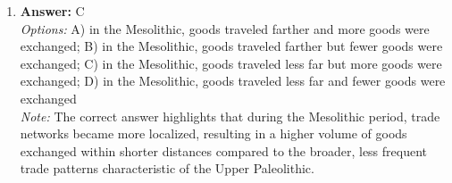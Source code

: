 \documentclass[12pt]{article}
\begin{document}
\begin{enumerate}[label=\arabic*.]
\\ \textit{Note:} The correct answer highlights that Charles Darwin's theory of natural selection explains the evolution of species over time, while early archaeologists recognized that human culture also evolved gradually, reflecting changes in society and technology over vast periods.
\item \textbf{Answer:} C
\\ \textit{Options:} A) in the Mesolithic, goods traveled farther and more goods were exchanged; B) in the Mesolithic, goods traveled farther but fewer goods were exchanged; C) in the Mesolithic, goods traveled less far but more goods were exchanged; D) in the Mesolithic, goods traveled less far and fewer goods were exchanged
\\ \textit{Note:} The correct answer highlights that during the Mesolithic period, trade networks became more localized, resulting in a higher volume of goods exchanged within shorter distances compared to the broader, less frequent trade patterns characteristic of the Upper Paleolithic.
\end{enumerate}
\end{document}
